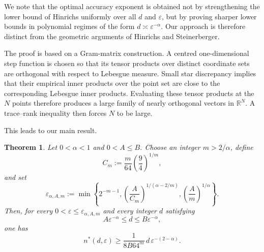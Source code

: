 \documentclass[10pt,a4paper]{amsart}
\newtheorem{theorem}{Theorem}[section]
\newcommand{\1}{\mathbf{1}}
\newcommand{\R}{\mathbb{R}}
\begin{document}
We note that the optimal accuracy exponent is obtained not by strengthening the lower bound of Hinrichs uniformly over all $d$ and $\varepsilon$, but by proving sharper lower bounds in polynomial regimes of the form $d\asymp\varepsilon^{-\alpha}$. Our approach is therefore distinct from the geometric arguments of Hinrichs and Steinerberger.

The proof is based on a Gram-matrix construction.  A centred one-dimensional step function is chosen so that its tensor products over distinct coordinate sets are orthogonal with respect to Lebesgue measure.  Small star discrepancy implies that their empirical inner products over the point set are close to the corresponding Lebesgue inner products.  Evaluating these tensor products at the \(N\) points therefore produces a large family of nearly orthogonal vectors in \(\R^N\).  A trace--rank inequality then forces \(N\) to be large.  


This leads to our main result.


\begin{theorem}\label{thm:main-strip}
Let \(0<\alpha<1\) and \(0<A\le B\).  Choose an integer \(m>2/\alpha\), define
\begin{equation}\label{eq:intro-Cm}
 C_m:=\frac m{64}\left(\frac94\right)^{1/m},
\end{equation}
and set
\begin{equation}\label{eq:intro-epsilon-alpha}
 \varepsilon_{\alpha,A,m}
 :=
 \min\left\{
 2^{-m-1},
 \left(\frac A{C_m}\right)^{1/(\alpha-2/m)},
 \left(\frac A m\right)^{1/\alpha}
 \right\}.
\end{equation}
Then, for every \(0<\varepsilon\le\varepsilon_{\alpha,A,m}\) and every integer \(d\) satisfying
\begin{equation}\label{eq:intro-alpha-strip}
 A\varepsilon^{-\alpha}\le d\le B\varepsilon^{-\alpha},
\end{equation}
one has
\begin{equation*}
 n^{\ast}(d,\varepsilon)
 \ge
 \frac1{8B64^m}\,
 d\,\varepsilon^{-(2-\alpha)}.
\end{equation*}
\end{theorem}
\end{document}
